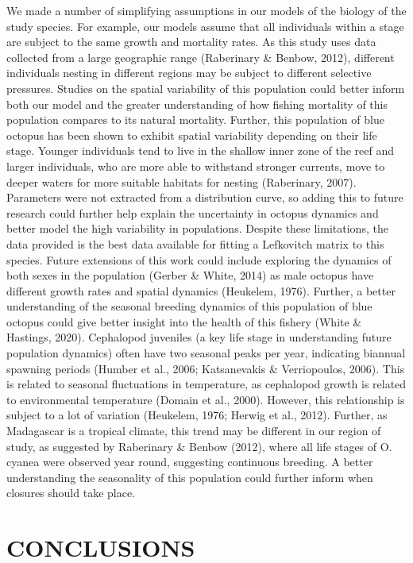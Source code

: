 \documentclass[
]{article}
\begin{document}
We made a number of simplifying assumptions in our models of the biology of the study species. For example, our models assume that all individuals within a stage are subject to the same growth and mortality rates. As this study uses data collected from a large geographic range (Raberinary \& Benbow, 2012), different individuals nesting in different regions may be subject to different selective pressures. Studies on the spatial variability of this population could better inform both our model and the greater understanding of how fishing mortality of this population compares to its natural mortality. Further, this population of blue octopus has been shown to exhibit spatial variability depending on their life stage. Younger individuals tend to live in the shallow inner zone of the reef and larger individuals, who are more able to withstand stronger currents, move to deeper waters for more suitable habitats for nesting (Raberinary, 2007). Parameters were not extracted from a distribution curve, so adding this to future research could further help explain the uncertainty in octopus dynamics and better model the high variability in populations. Despite these limitations, the data provided is the best data available for fitting a Lefkovitch matrix to this species. Future extensions of this work could include exploring the dynamics of both sexes in the population (Gerber \& White, 2014) as male octopus have different growth rates and spatial dynamics (Heukelem, 1976). Further, a better understanding of the seasonal breeding dynamics of this population of blue octopus could give better insight into the health of this fishery (White \& Hastings, 2020). Cephalopod juveniles (a key life stage in understanding future population dynamics) often have two seasonal peaks per year, indicating biannual spawning periods (Humber et al., 2006; Katsanevakis \& Verriopoulos, 2006). This is related to seasonal fluctuations in temperature, as cephalopod growth is related to environmental temperature (Domain et al., 2000). However, this relationship is subject to a lot of variation (Heukelem, 1976; Herwig et al., 2012). Further, as Madagascar is a tropical climate, this trend may be different in our region of study, as suggested by Raberinary \& Benbow (2012), where all life stages of O. cyanea were observed year round, suggesting continuous breeding. A better understanding the seasonality of this population could further inform when closures should take place.

\hypertarget{conclusions}{%
\section{CONCLUSIONS}\label{conclusions}}
\end{document}
